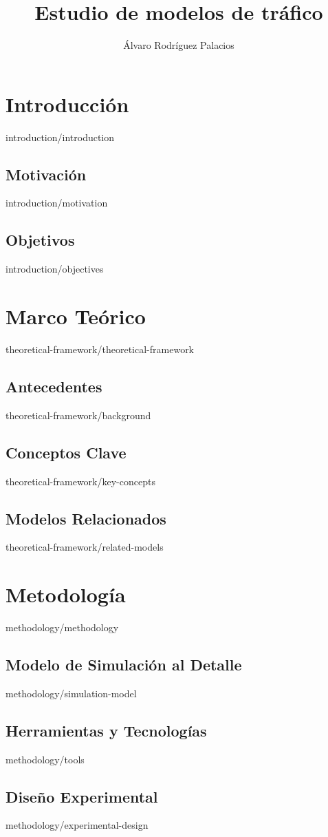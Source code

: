 \documentclass[epsbased,copyright,final,extendedindex,firstnumbered,tfm,gnuplot,spanish,loa,loe,lof,lot]{tfgtfmthesisuam} %
\title{Estudio de modelos de tráfico}
\author{Álvaro Rodríguez Palacios}
\begin{document}
\chapter{Introducción\label{CAP:INTRODUCCION}}{introduction/introduction}
  \section{Motivación\label{SEC:MOTIVACION}}{introduction/motivation}
  \section{Objetivos\label{SEC:OBJETIVOS}}{introduction/objectives}

\chapter{Marco Teórico\label{CAP:THEORETICALFRAMEWORK}}{theoretical-framework/theoretical-framework}
  \section{Antecedentes\label{SEC:BACKGROUND}}{theoretical-framework/background}
  \section{Conceptos Clave\label{SEC:KEYCONCEPTS}}{theoretical-framework/key-concepts}
  \section{Modelos Relacionados\label{SEC:SIMULATIONMODEL}}{theoretical-framework/related-models}

\chapter{Metodología\label{CAP:METHODOLOGY}}{methodology/methodology}
  \section{Modelo de Simulación al Detalle\label{SEC:SIMULATIONMODELD}}{methodology/simulation-model}
  \section{Herramientas y Tecnologías\label{SEC:TOOLS}}{methodology/tools}
  \section{Diseño Experimental\label{SEC:EXPERIMENTALDESIGN}}{methodology/experimental-design}
\end{document}
